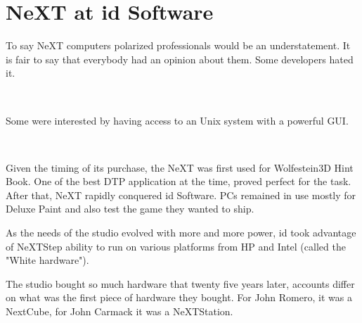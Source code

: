 \section{NeXT at id Software}
To say NeXT computers polarized professionals would be an understatement. It is fair to say that everybody had an opinion about them. Some developers hated it.\\
\par
{}\\
\par
Some were interested by having access to an Unix system with a powerful GUI.\\
\par
{}\\
\par
Given the timing of its purchase, the NeXT was first used for Wolfestein3D Hint Book. One of the best DTP application at the time,  proved perfect for the task. After that, NeXT rapidly conquered id Software. PCs remained in use mostly for Deluxe Paint and also test the game they wanted to ship.\\
\par
As the needs of the studio evolved with more and more power, id took advantage of NeXTStep ability to run on various platforms from HP and Intel (called the "White hardware").\\
\par
The studio bought so much hardware that twenty five years later, accounts differ on what was the first piece of hardware they bought. For John Romero, it was a NextCube, for John Carmack it was a NeXTStation.\\
\par



